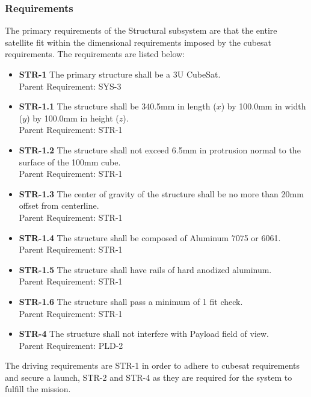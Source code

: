 \documentclass[12pt]{article}
\begin{document}
\subsubsection{Requirements}

The primary requirements of the Structural subsystem are that the entire satellite fit within the dimensional requirements imposed by the cubesat requirements. The requirements are listed below:

\begin{itemize}
\item \textbf{STR-1} The primary structure shall be a 3U CubeSat. \\
Parent Requirement: SYS-3

\item \textbf{STR-1.1} The structure shall be 340.5mm in length ($x$) by 100.0mm in width ($y$) by 100.0mm in height ($z$).\\
Parent Requirement: STR-1

\item \textbf{STR-1.2} The structure shall not exceed 6.5mm in protrusion normal to the surface of the 100mm cube.\\
Parent Requirement: STR-1

\item \textbf{STR-1.3} The center of gravity of the structure shall be no more than 20mm offset from centerline.\\
Parent Requirement: STR-1

\item \textbf{STR-1.4} The structure shall be composed of Aluminum 7075 or 6061.\\
Parent Requirement: STR-1

\item \textbf{STR-1.5} The structure shall have rails of hard anodized aluminum.\\
Parent Requirement: STR-1

\item \textbf{STR-1.6} The structure shall pass a minimum of 1 fit check.\\
Parent Requirement: STR-1

\item \textbf{STR-4} The structure shall not interfere with Payload field of view.\\
Parent Requirement: PLD-2

\end{itemize}

The driving requirements are STR-1 in order to adhere to cubesat requirements and secure a launch, STR-2 and STR-4 as they are required for the system to fulfill the mission.
\end{document}
